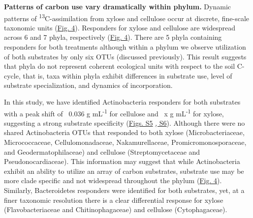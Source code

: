 \textbf{Patterns of carbon use vary dramatically within phylum.} Dynamic patterns of \textsuperscript{13}C-assimilation from xylose and cellulose occur at discrete, fine-scale taxonomic units (\href{https://authorea.com/users/3537/articles/3612/master/file/figures/bacteria_tree/bacteria_tree.png}{Fig. 4}). Responders for xylose and cellulose are widespread across 6 and 7 phyla, respectively (\href{https://authorea.com/users/3537/articles/3612/master/file/figures/bacteria_tree/bacteria_tree.png}{Fig. 4}). There are 5 phyla containing responders for both treatments although within a phylum we observe utilization of both substrates by only six OTUs (discussed previously). This result suggests that phyla do not represent coherent ecological units with respect to the soil C-cycle, that is, taxa within phyla exhibit differences in substrate use, level of substrate specialization, and dynamics of incorporation. 

In this study, we have identified Actinobacteria responders for both substrates with a peak shift of ~0.036 g mL\textsuperscript{-1} for cellulose and ~x g mL\textsuperscript{-1} for xylose, suggesting a strong substrate specificity (\href{https://authorea.com/users/3537/articles/8459/master/file/figures/xylose_resp_profiles/xylose_resp_profiles.png}{Figs. S5} \href{https://authorea.com/users/3537/articles/8459/master/file/figures/cellulose_resp_profiles/cellulose_resp_profiles.png}{, S6}). Although there were no shared Actinobacteria OTUs that responded to both xylose (Microbacteriaceae, Micrococcaceae, Cellulomonadaceae, Nakamurellaceae, Promicromonosporaceae, and Geodermatophilaceae) and cellulose (Streptomycetaceae and Pseudonocardiaceae). This information may suggest that while Actinobacteria exhibit an ability to utilize an array of carbon substrates, substrate use may be more clade specific and not widespread throughout the phylum (\href{https://authorea.com/users/3537/articles/3612/master/file/figures/bacteria_tree/bacteria_tree.png}{Fig. 4}). Similarly, Bacteroidetes responders were identified for both substrates, yet, at a finer taxonomic resolution there is a clear differential response for xylose (Flavobacteriaceae and Chitinophagaceae) and cellulose (Cytophagaceae). 



